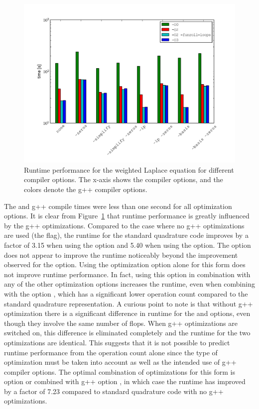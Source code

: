 \begin{figure}
  \center\includegraphics[width=\largefig]{chapters/oelgaard-2/pdf/runtime_laplace.pdf}
  \caption{Runtime performance for the weighted Laplace equation for
    different compiler options.  The x-axis shows the \ffc{}
    compiler options, and the colors denote the g++ compiler
    options.}
  \label{oelgaard-2:fig:laplace_stats_2}
\end{figure}

The \ffc{} and g++ compile times were less than one second for all
optimization options.  It is clear from
Figure~\ref{oelgaard-2:fig:laplace_stats_2} that runtime performance
is greatly influenced by the g++ optimizations.  Compared to the case
where no g++ optimizations are used (the  flag), the runtime
for the standard quadrature code improves by a factor of 3.15 when
using the  option and 5.40 when using the  option.  The  option does not appear to
improve the runtime noticeably beyond the improvement observed for the
 option.  Using the \ffc{} optimization option
 alone for this form does not improve runtime performance.
In fact, using this option in combination with any of the other
optimization options increases the runtime, even when combining with
the option , which has a significant lower operation
count compared to the standard quadrature representation.  A curious
point to note is that without g++ optimization there is a significant
difference in runtime for the  and  options, even
though they involve the same number of flops.  When g++ optimizations
are switched on, this difference is eliminated completely and the
runtime for the two \ffc{} optimizations are identical.  This suggests
that it is not possible to predict runtime performance from the
operation count alone since the type of \ffc{} optimization must be
taken into account as well as the intended use of g++ compiler
options.  The optimal combination of optimizations for this form is
\ffc{} option  or  combined with g++ option
, in which case the runtime has improved by a factor of 7.23
compared to standard quadrature code with no g++ optimizations.

